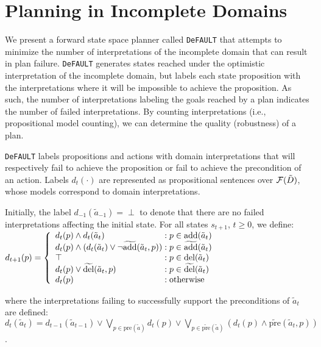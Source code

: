 \documentclass{article}
\def\und#1{\noindent{\bf #1}:}
\def\FFRISKY{{\tt DeFAULT}}
\def\und#1{\medskip{\noindent\bf #1:}}
\begin{document}
\section{Planning in Incomplete Domains}

We present a forward state space planner called \FFRISKY{} that attempts to minimize the number of interpretations of the incomplete domain that can result in plan failure.  \FFRISKY{} generates states reached under the optimistic interpretation of the incomplete domain, but labels each state proposition with the interpretations where it will be impossible to achieve the proposition.  As such, the number of interpretations labeling the goals reached by a plan indicates the number of failed interpretations.  By counting interpretations (i.e., propositional model counting), we can determine the quality (robustness) of a plan.

\und{Label Propagation}  \FFRISKY{} labels propositions and actions with domain interpretations that will respectively fail to achieve the proposition or fail to achieve the precondition of an action.  Labels $d_t(\cdot)$ are represented as  propositional sentences over ${\cal F}(\tilde{D})$, whose models correspond to domain interpretations.  

Initially, the label $d_{-1}(\tilde{a}_{-1}) = \perp$ to denote that there are no failed interpretations affecting the initial state.  For all states $s_{t+1}$, $t \geq 0$, we define: \\
\noindent$d_{t+1}(p) = \left\{
\begin{array}{l@{\;}l@{\;}r}
d_t(p) \wedge d_t(\tilde{a}_t) & : p \in \text{add}(\tilde{a}_t) \\
d_t(p) \wedge  (d_t(\tilde{a}_t) \vee \neg\widetilde{\text{add}}(\tilde{a}_t, p)) & : p \in \widetilde{\text{add}}(\tilde{a}_t)\\
\top & : p \in \text{del}(\tilde{a}_t)\\
d_t(p) \vee  \widetilde{\text{del}}(\tilde{a}_t, p) %
 &: p \in \widetilde{\text{del}}(\tilde{a}_t)\\
d_t(p) & : \text{otherwise} 
\end{array}
\right. $

\noindent where the interpretations failing to successfully support the preconditions of $\tilde{a}_t$ are defined:
$d_t(\tilde{a}_t) =  %
d_{t-1}(\tilde{a}_{t-1}) \vee \bigvee\limits_{p \in \text{pre}(\tilde{a})} d_t(p) \vee \bigvee\limits_{p \in \widetilde{\text{pre}}(\tilde{a})} (d_t(p) \wedge \widetilde{\text{pre}}(\tilde{a}_t, p)  ) %
$.
\end{document}
